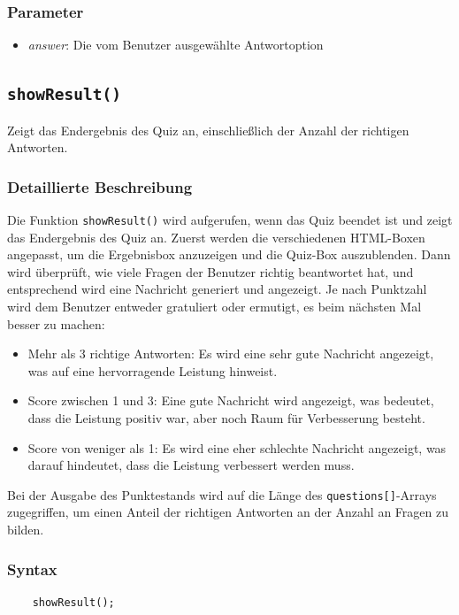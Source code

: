 \documentclass[10pt, fleqn]{scrartcl}
\begin{document}
\subsubsection*{Parameter}
\begin{itemize}
	\item \textit{answer}: Die vom Benutzer ausgewählte Antwortoption
\end{itemize}

\subsection{\texttt{showResult()}}
Zeigt das Endergebnis des Quiz an, einschließlich der Anzahl der richtigen Antworten.

\subsubsection*{Detaillierte Beschreibung}

Die Funktion \texttt{showResult()} wird aufgerufen, wenn das Quiz beendet ist und zeigt das Endergebnis des Quiz an.
Zuerst werden die verschiedenen HTML-Boxen angepasst, um die Ergebnisbox anzuzeigen und die Quiz-Box auszublenden.
Dann wird überprüft, wie viele Fragen der Benutzer richtig beantwortet hat, und entsprechend wird eine Nachricht generiert und angezeigt.
Je nach Punktzahl wird dem Benutzer entweder gratuliert oder ermutigt, es beim nächsten Mal besser zu machen:
\begin{itemize}
	\item Mehr als 3 richtige Antworten: Es wird eine sehr gute Nachricht angezeigt, was auf eine hervorragende Leistung hinweist.
	\item Score zwischen 1 und 3: Eine gute Nachricht wird angezeigt, was bedeutet, dass die Leistung positiv war, aber noch Raum für Verbesserung besteht.
	\item Score von weniger als 1: Es wird eine eher schlechte Nachricht angezeigt, was darauf hindeutet, dass die Leistung verbessert werden muss.
\end{itemize}

Bei der Ausgabe des Punktestands wird auf die Länge des \texttt{questions[]}-Arrays zugegriffen, um einen Anteil der richtigen Antworten an der Anzahl an Fragen zu bilden.

\subsubsection*{Syntax}
\begin{lstlisting}
	showResult();
\end{lstlisting}
\end{document}
